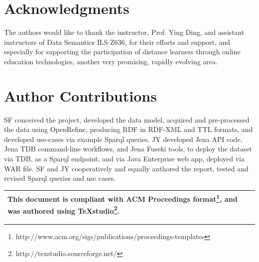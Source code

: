 \documentclass{acm_proc_article-sp}
\begin{document}
\section{Acknowledgments}
The authors would like to thank the instructor, Prof. Ying Ding, and assistant instructors of Data Semantics ILS-Z636, for their efforts and support, and especially for supporting the participation of distance learners through online education technologies, another very promising, rapidly evolving area.

\section{Author Contributions}
SF conceived the project, developed the data model, acquired and pre-processed the data using OpenRefine, producing RDF in RDF-XML and TTL formats, and developed use-cases via example Sparql queries. JY developed Jena API code, Jena TDB command-line workflows, and Jena Fuseki tools, to deploy the dataset via TDB, as a Sparql endpoint, and via Java Enterprise web app, deployed via WAR file. SF and JY cooperatively and equally authored the report, tested and revised Sparql queries and use cases.



\begin{table}[h]
	\centering
	\begin{tabular}[width=\linewidth]{|L|}
		\hline
	This document is compliant with ACM Proceedings format\footnote{http://www.acm.org/sigs/publications/proceedings-templates}, and was authored using TeXstudio\footnote{http://texstudio.sourceforge.net/}. \\
		\hline 
	\end{tabular}
\end{table}
\end{document}
